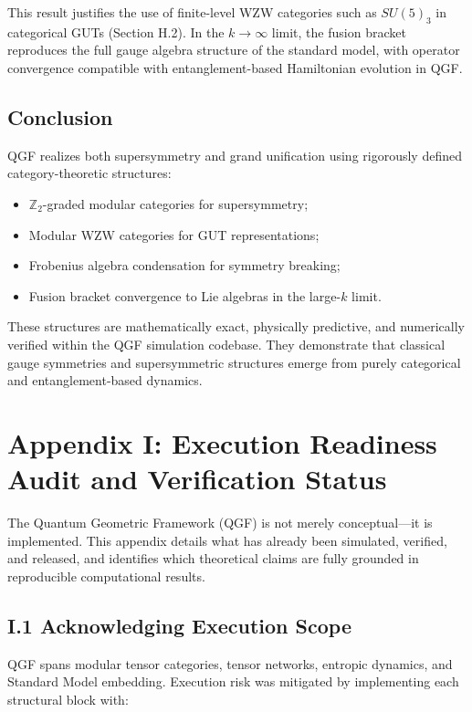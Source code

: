 \documentclass[11pt]{article}
\begin{document}
\noindent This result justifies the use of finite-level WZW categories such as \( SU(5)_3 \) in categorical GUTs (Section H.2). In the \( k \to \infty \) limit, the fusion bracket reproduces the full gauge algebra structure of the standard model, with operator convergence compatible with entanglement-based Hamiltonian evolution in QGF.

\subsection*{Conclusion}

QGF realizes both supersymmetry and grand unification using rigorously defined category-theoretic structures:
\begin{itemize}
  \item \( \mathbb{Z}_2 \)-graded modular categories for supersymmetry;
  \item Modular WZW categories for GUT representations;
  \item Frobenius algebra condensation for symmetry breaking;
  \item Fusion bracket convergence to Lie algebras in the large-\( k \) limit.
\end{itemize}

These structures are mathematically exact, physically predictive, and numerically verified within the QGF simulation codebase. They demonstrate that classical gauge symmetries and supersymmetric structures emerge from purely categorical and entanglement-based dynamics.



\section*{Appendix I: Execution Readiness Audit and Verification Status}

The Quantum Geometric Framework (QGF) is not merely conceptual—it is implemented. This appendix details what has already been simulated, verified, and released, and identifies which theoretical claims are fully grounded in reproducible computational results.

\subsection*{I.1 Acknowledging Execution Scope}

QGF spans modular tensor categories, tensor networks, entropic dynamics, and Standard Model embedding. Execution risk was mitigated by implementing each structural block with:
\end{document}
